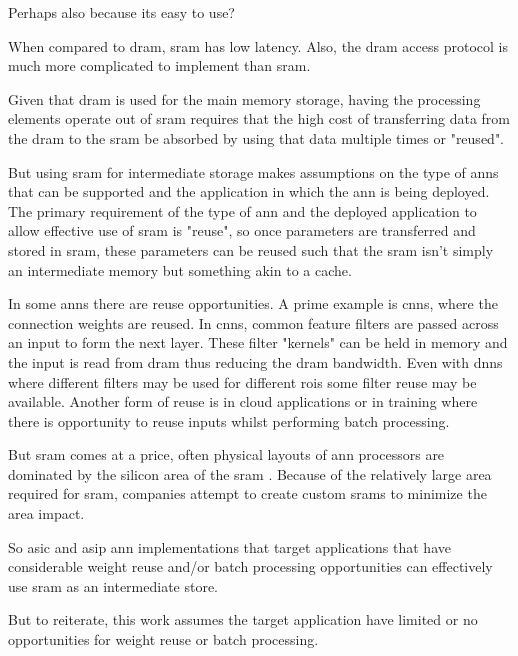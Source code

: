Perhaps also because its easy to use? 

When compared to \ac{dram}, \ac{sram} has low latency. Also, the \ac{dram} access protocol is much more complicated to implement than \ac{sram}. 

Given that \ac{dram} is used for the main memory storage, having the processing elements operate out of \ac{sram} requires that the high cost of transferring data from the \ac{dram} to the \ac{sram} be absorbed by using that data multiple times or "reused".

But using \ac{sram} for intermediate storage makes assumptions on the type of \acp{ann} that can be supported and the application in which the \ac{ann} is being deployed.
The primary requirement of the type of \ac{ann} and the deployed application to allow effective use of \ac{sram} is "reuse", so once parameters are transferred and stored in \ac{sram}, these parameters can be reused such that the \ac{sram} isn't simply an intermediate memory but something akin to a cache.

In some \ac{ann}s there are reuse opportunities. 
A prime example is \acp{cnn}, where the connection weights are reused. In \acp{cnn}, common feature filters are passed across an input to form the next layer. 
These filter "kernels" can be held in memory and the input is read from \ac{dram} thus reducing the \ac{dram} bandwidth.
Even with \ac{dnn}s where different filters may be used for different \acp{roi} some filter reuse may be available.
Another form of reuse is in cloud applications or in training where there is opportunity to reuse inputs whilst performing batch processing.

But \ac{sram} comes at a price, often physical layouts of \ac{ann} processors are dominated by the silicon area of the \ac{sram} \cite{kim2016neurocube}\cite{chen2014diannao}\cite{tensorflow2015-whitepaper}. 
Because of the relatively large area required for \ac{sram}, companies attempt to create custom \acp{sram} to minimize the area impact.

So \ac{asic} and \ac{asip} \ac{ann} implementations that target applications that have considerable weight reuse and/or batch processing opportunities can effectively use \ac{sram} as an intermediate store.

But to reiterate, this work assumes the target application have limited or no opportunities for weight reuse or batch processing.

\iffalse
So the question becomes, can a system employ \ac{dram} with minimal \ac{sram} and still meet the system requirements?
\fi

